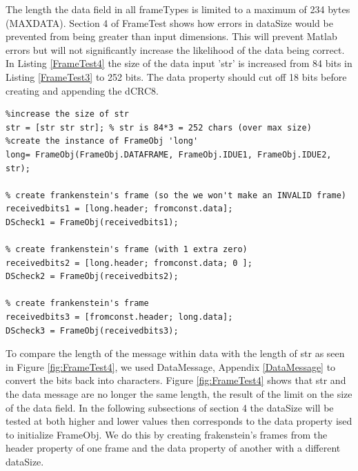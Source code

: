 The length the data field in all frameTypes is limited to a maximum of 234 bytes (MAXDATA). Section 4 of FrameTest shows how errors in dataSize would be prevented from being greater than input dimensions. This will prevent Matlab errors but will not significantly increase the likelihood of the data being correct. In Listing \ref{FrameTest4} the size of the data input 'str' is increased from 84 bits in Listing \ref{FrameTest3} to 252 bits. The data property should cut off 18 bits before creating and appending the dCRC8.

\begin{lstlisting} 
%increase the size of str
str = [str str str]; % str is 84*3 = 252 chars (over max size)
%create the instance of FrameObj 'long'
long= FrameObj(FrameObj.DATAFRAME, FrameObj.IDUE1, FrameObj.IDUE2, str);

% create frankenstein's frame (so the we won't make an INVALID frame)
receivedbits1 = [long.header; fromconst.data];
DScheck1 = FrameObj(receivedbits1);

% create frankenstein's frame (with 1 extra zero)
receivedbits2 = [long.header; fromconst.data; 0 ];
DScheck2 = FrameObj(receivedbits2);

% create frankenstein's frame
receivedbits3 = [fromconst.header; long.data];
DScheck3 = FrameObj(receivedbits3);
\end{lstlisting} 

To compare the length of the message within data with the length of str as seen in Figure \ref{fig:FrameTest4}, we used DataMessage, Appendix \ref{DataMessage} to convert the bits back into characters.  Figure \ref{fig:FrameTest4} shows that str and the data message are no longer the same length, the result of the limit on the size of the data field. In the following subsections of section 4 the dataSize will be tested at both higher and lower values then corresponds to the data property ised to initialize FrameObj. We do this by creating frakenstein's frames from the header property of one frame and the data property of another with a different dataSize. 

